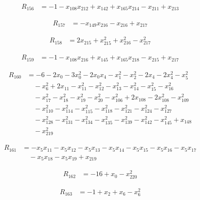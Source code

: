 \begin{align*}
R_{156} &= -1 -x_{108} x_{212} +x_{142} +x_{165} x_{214} -x_{211} +x_{213}
\end{align*}

\begin{align*}
R_{157} &= -x_{149} x_{216} -x_{216} +x_{217}
\end{align*}

\begin{align*}
R_{158} &= 2 x_{215} +x_{215}^{2} +x_{216}^{2} -x_{217}^{2}
\end{align*}

\begin{align*}
R_{159} &= -1 -x_{108} x_{216} +x_{145} +x_{165} x_{218} -x_{215} +x_{217}
\end{align*}

\begin{align*}
R_{160} &= -6 -2 x_{0} -3 x_{0}^{2} -2 x_{0} x_{4} -x_{1}^{2} -x_{2}^{2} -2 x_{4} -2 x_{4}^{2} -x_{5}^{2} \\
&\quad -x_{6}^{2} +2 x_{11} -x_{11}^{2} -x_{12}^{2} -x_{13}^{2} -x_{14}^{2} -x_{15}^{2} -x_{16}^{2} \\
&\quad -x_{17}^{2} -x_{18}^{2} -x_{19}^{2} -x_{20}^{2} -x_{106}^{2} +2 x_{108} -2 x_{108}^{2} -x_{109}^{2} \\
&\quad -x_{110}^{2} -x_{114}^{2} -x_{115}^{2} -x_{118}^{2} -x_{121}^{2} -x_{124}^{2} -x_{127}^{2} \\
&\quad -x_{128}^{2} -x_{131}^{2} -x_{134}^{2} -x_{135}^{2} -x_{139}^{2} -x_{142}^{2} -x_{145}^{2} +x_{148} \\
&\quad -x_{219}^{2}
\end{align*}

\begin{align*}
R_{161} &= -x_{5} x_{11} -x_{5} x_{12} -x_{5} x_{13} -x_{5} x_{14} -x_{5} x_{15} -x_{5} x_{16} -x_{5} x_{17} \\
&\quad -x_{5} x_{18} -x_{5} x_{19} +x_{219}
\end{align*}

\begin{align*}
R_{162} &= -16 +x_{0} -x_{220}^{2}
\end{align*}

\begin{align*}
R_{163} &= -1 +x_{2} +x_{6} -x_{6}^{2}
\end{align*}

